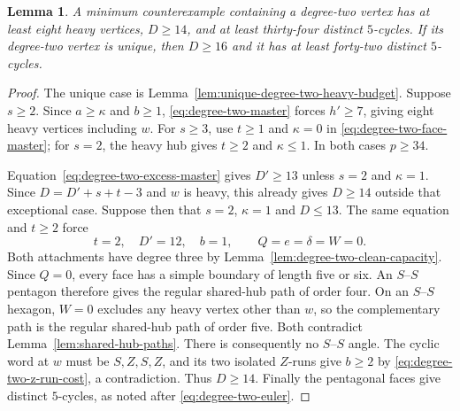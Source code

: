 \documentclass[11pt]{article}
\newtheorem{lemma}[theorem]{Lemma}
\theoremstyle{remark}
\numberwithin{equation}{section}
\numberwithin{table}{section}
\begin{document}
\begin{lemma}\label{lem:degree-two-eight-heavy}
A minimum counterexample containing a degree-two vertex has at least
eight heavy vertices, $D\ge14$, and at least thirty-four distinct
$5$-cycles. If its degree-two vertex is unique, then $D\ge16$ and
it has at least forty-two distinct $5$-cycles.
\end{lemma}
\begin{proof}
The unique case is Lemma~\ref{lem:unique-degree-two-heavy-budget}.
Suppose $s\ge2$. Since $a\ge\kappa$ and $b\ge1$,
\eqref{eq:degree-two-master} forces $h'\ge7$, giving eight heavy
vertices including $w$. For $s\ge3$, use $t\ge1$ and $\kappa=0$ in
\eqref{eq:degree-two-face-master}; for $s=2$, the heavy hub gives
$t\ge2$ and $\kappa\le1$. In both cases $p\ge34$.

Equation~\eqref{eq:degree-two-excess-master} gives $D'\ge13$
unless $s=2$ and $\kappa=1$. Since $D=D'+s+t-3$ and $w$ is heavy,
this already gives $D\ge14$ outside that exceptional case. Suppose
then that $s=2$, $\kappa=1$ and $D\le13$. The same equation and
$t\ge2$ force
\[
 t=2,\quad D'=12,\quad b=1,\qquad Q=e=\delta=W=0.
\]
Both attachments have degree three by
Lemma~\ref{lem:degree-two-clean-capacity}. Since $Q=0$, every face
has a simple boundary of length five or six. An $S$--$S$ pentagon
therefore gives the regular shared-hub path of order four. On an
$S$--$S$ hexagon, $W=0$ excludes any heavy vertex other than $w$,
so the complementary path is the regular shared-hub path of order
five. Both contradict Lemma~\ref{lem:shared-hub-paths}. There is
consequently no $S$--$S$ angle. The cyclic word at $w$ must be
$S,Z,S,Z$, and its two isolated $Z$-runs give $b\ge2$ by
\eqref{eq:degree-two-z-run-cost}, a contradiction. Thus $D\ge14$.
Finally the pentagonal faces give distinct $5$-cycles, as noted
after \eqref{eq:degree-two-euler}.
\end{proof}
\end{document}
